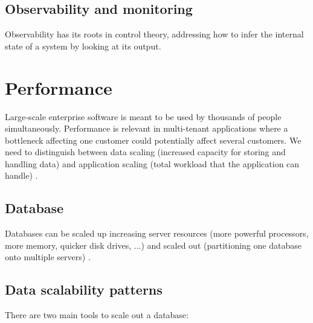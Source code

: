 \documentclass[11pt,english]{article} %
\begin{document}
\subsection{Observability and monitoring}
Observability has its roots in control theory, addressing how to infer the internal state of a system by looking at its output. %



\section{Performance}
Large‐scale enterprise software is meant to be used by thousands of people simultaneously.
Performance is relevant in multi-tenant applications where a bottleneck affecting one customer could potentially affect several customers.
We need to distinguish between data scaling (increased capacity for storing and handling data) and application scaling (total workload that the application can handle) \cite{multi-tenant-data-architecture}.



\subsection{Database}
Databases can be scaled up increasing server resources (more powerful processors, more memory, quicker disk drives, ...) and scaled out (partitioning one database onto multiple servers) \cite{multi-tenant-data-architecture}.

\subsection{Data scalability patterns}
There are two main tools to scale out a database:
\end{document}

